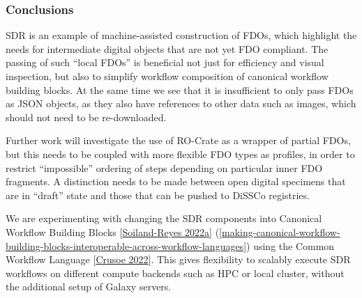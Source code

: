 \hypertarget{conclusions-1}{%
\subsubsection{Conclusions}\label{conclusions-1}}

SDR is an example of machine-assisted construction of FDOs, which
highlight the needs for intermediate digital objects that are not yet
FDO compliant. The passing of such ``local FDOs'' is beneficial not just
for efficiency and visual inspection, but also to simplify workflow
composition of canonical workflow building blocks. At the same time we
see that it is insufficient to only pass FDOs as JSON objects, as they
also have references to other data such as images, which should not need
to be re-downloaded.

Further work will investigate the use of RO-Crate as a wrapper of
partial FDOs, but this needs to be coupled with more flexible FDO types
as profiles, in order to restrict ``impossible'' ordering of steps
depending on particular inner FDO fragments. A distinction needs to be
made between open digital specimens that are in ``draft'' state and
those that can be pushed to DiSSCo registries.

We are experimenting with changing the SDR components into Canonical
Workflow Building Blocks
{[}\href{https://doi.org/10.1162/dint_a_00135}{Soiland-Reyes 2022a}{]}
(\vref{making-canonical-workflow-building-blocks-interoperable-across-workflow-languages}) 
using the Common Workflow Language
{[}\href{https://doi.org/10.1145/3486897}{Crusoe 2022}{]}. This gives
flexibility to scalably execute SDR workflows on different compute
backends such as HPC or local cluster, without the additional setup of
Galaxy servers.

